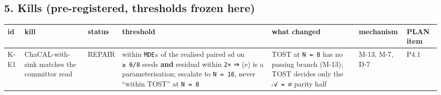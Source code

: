 \documentclass[11pt,a4paper]{article}
\newcounter{none}                 %
\theoremstyle{plain}
\theoremstyle{definition}
\theoremstyle{remark}
\begin{document}
\subsection{5. Kills (pre-registered, thresholds frozen
here)}\label{kills-pre-registered-thresholds-frozen-here}

{\def\LTcaptype{none} %
\begin{longtable}[]{@{}
  >{\raggedright\arraybackslash}p{}
  >{\raggedright\arraybackslash}p{}
  >{\raggedright\arraybackslash}p{}
  >{\raggedright\arraybackslash}p{}
  >{\raggedright\arraybackslash}p{}
  >{\raggedright\arraybackslash}p{}
  >{\raggedright\arraybackslash}p{}@{}}
\toprule\noalign{}
\begin{minipage}[b]{\linewidth}\raggedright
id
\end{minipage} & \begin{minipage}[b]{\linewidth}\raggedright
kill
\end{minipage} & \begin{minipage}[b]{\linewidth}\raggedright
status
\end{minipage} & \begin{minipage}[b]{\linewidth}\raggedright
threshold
\end{minipage} & \begin{minipage}[b]{\linewidth}\raggedright
what changed
\end{minipage} & \begin{minipage}[b]{\linewidth}\raggedright
mechanism
\end{minipage} & \begin{minipage}[b]{\linewidth}\raggedright
PLAN item
\end{minipage} \\
\midrule\noalign{}
\endhead
\bottomrule\noalign{}
\endlastfoot
K-E1 & ChaCAL-with-sink matches the committor read & REPAIR & within
\texttt{MDE₈} of the realised paired sd on \texttt{≥\ 6/8} seeds
\textbf{and} residual within \texttt{2×} ⇒ (e) is a parameterisation;
escalate to \texttt{N\ =\ 16}, never ``within TOST'' at \texttt{N\ =\ 8}
& TOST at \texttt{N\ =\ 8} has no passing branch (M-13); TOST decides
only the \texttt{𝒜\ =\ ∅} parity half & M-13, M-7, D-7 & P4.1 \\

\end{longtable}}
\end{document}
